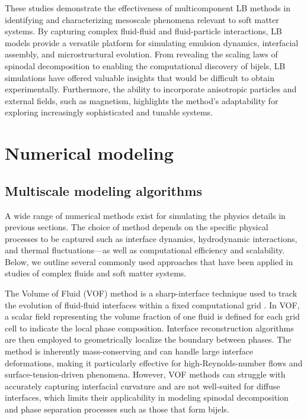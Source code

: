 These studies demonstrate the effectiveness of multicomponent LB methods in identifying and characterizing mesoscale phenomena relevant to soft matter systems. By capturing 
complex fluid-fluid and fluid-particle interactions, LB models provide a versatile platform for simulating emulsion dynamics, interfacial assembly, and 
microstructural evolution. From revealing the scaling laws of spinodal decomposition to enabling the computational discovery of bijels, LB simulations have offered valuable insights that would be 
difficult to obtain experimentally. Furthermore, the ability to incorporate anisotropic particles and external fields, such as magnetism, highlights the method's adaptability for exploring 
increasingly sophisticated and tunable systems. 

\section{Numerical modeling}

\subsection{Multiscale modeling algorithms}

A wide range of numerical methods exist for simulating the physics details in previous sections. The choice of method depends on the specific physical processes to be captured such as 
interface dynamics, hydrodynamic interactions, and thermal fluctuations—as well as computational efficiency and scalability. Below, we outline several commonly used approaches that have been 
applied in studies of complex fluids and soft matter systems.

The Volume of Fluid (VOF) method is a sharp-interface technique used to track the evolution of fluid-fluid interfaces within a fixed computational grid 
\cite{gopala_volume_2008, fleckenstein_volume-fluid-based_2015, deising_direct_2018}. In VOF, a scalar field representing the volume fraction of one 
fluid is defined for each grid cell to indicate the local phase composition. Interface reconstruction algorithms are then employed to geometrically 
localize the boundary between phases. The method is inherently mass-conserving and can handle large interface deformations, making it particularly 
effective for high-Reynolds-number flows and surface-tension-driven phenomena. However, VOF methods can struggle with accurately capturing interfacial 
curvature and are not well-suited for diffuse interfaces, which limits their applicability in modeling spinodal decomposition and phase separation 
processes such as those that form bijels.

